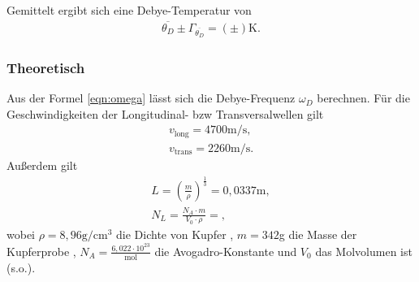 Gemittelt ergibt sich eine Debye-Temperatur von
\begin{align*}
  \overline{\theta_D} \pm \Gamma_{\overline{\theta_D}} = (\pm)\text{K}.
  \end{align*}

\subsubsection{Theoretisch}
Aus der Formel \eqref{eqn:omega} lässt sich die Debye-Frequenz $\omega_D$ berechnen.
Für die Geschwindigkeiten der Longitudinal- bzw Transversalwellen gilt \cite{skript}
\begin{align*}
  v_{\text{long}} = 4700\text{m{/s}}, \\
  v_{\text{trans}} = 2260\text{m/s}.
\end{align*}
Außerdem gilt
\begin{gather*}
  L = \left({\frac{m}{\rho}}\right)^{\frac{1}{3}} = 0,0337\text{m}, \\
  N_L = \frac{N_A \cdot m}{V_0 \cdot \rho} = ,
\end{gather*}
wobei $\rho = 8,96 \text{g}/\text{cm}^3$ die Dichte von Kupfer \cite{cu}, $m = 342$g die Masse der Kupferprobe \cite{skript},
$N_A = \frac{6,022\cdot10^{23}}{\text{mol}}$ die Avogadro-Konstante \cite{dem} und $V_0$ das Molvolumen ist (s.o.).
